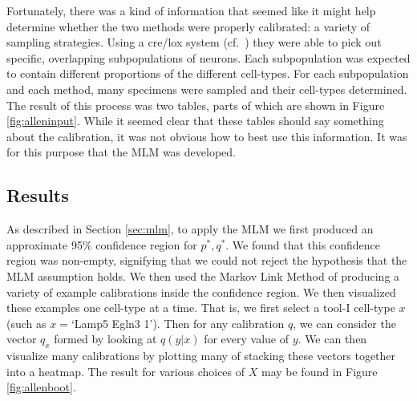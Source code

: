 Fortunately, there was a kind of information that seemed like it might help determine whether the two methods were properly calibrated: a variety of sampling strategies.  Using a cre/lox system (cf.\ \citep{tasic2017shared}) they were able to pick out specific, overlapping subpopulations of neurons.  Each subpopulation was expected to contain different proportions of the different cell-types.  For each subpopulation and each method, many specimens were sampled and their cell-types determined.  The result of this process was two tables, parts of which are shown in Figure \ref{fig:alleninput}.  While it seemed clear that these tables should say something about the calibration, it was not obvious how to best use this information.  It was for this purpose that the MLM was developed.

\subsection{Results}

As described in Section \ref{sec:mlm}, to apply the MLM we first produced an approximate 95\% confidence region for $p^*,q^*$.  We found that this confidence region was non-empty, signifying that we could not reject the hypothesis that the MLM assumption holds.  We then used the Markov Link Method of producing a variety of example calibrations inside the confidence region.  We then visualized these examples one cell-type at a time.  That is, we first select a tool-I cell-type $x$ (such as $x=$`Lamp5 Egln3 1').  Then for any calibration $q$, we can consider the vector $q_x$ formed by looking at $q(y|x)$ for every value of $y$.  We can then visualize many calibrations by plotting many of stacking these vectors together into a heatmap.  The result for various choices of $X$ may be found in Figure \ref{fig:allenboot}.



